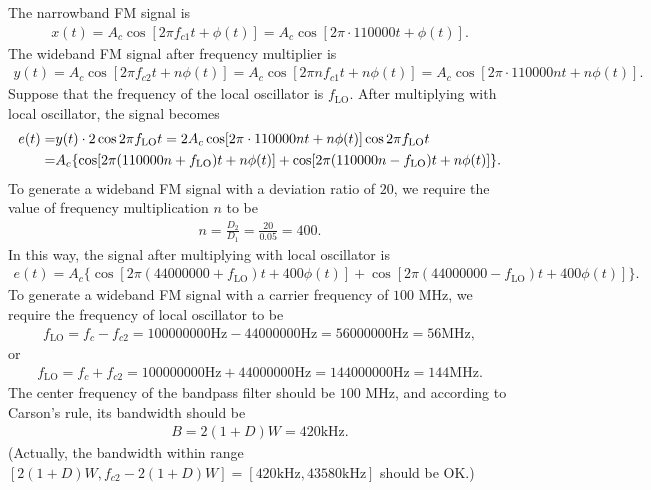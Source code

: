 \documentclass{assignment}
\begin{document}
\begin{sol}
    The narrowband FM signal is
    \begin{align}
        x(t)=A_c\cos[2\pi f_{c1}t+\phi(t)]=A_c\cos[2\pi\cdot 110000t+\phi(t)].
    \end{align}
    The wideband FM signal after frequency multiplier is
    \begin{align}
        y(t)=A_c\cos[2\pi f_{c2}t+n\phi(t)]=A_c\cos[2\pi nf_{c1}t+n\phi(t)]=A_c\cos[2\pi\cdot 110000nt+n\phi(t)].
    \end{align}
    Suppose that the frequency of the local oscillator is $f_{\text{LO}}$. After multiplying with local oscillator, the signal becomes
    \begin{align}
        \notag e(t)=&y(t)\cdot 2\cos 2\pi f_{\text{LO}}t=2A_c\cos[2\pi\cdot 110000nt+n\phi(t)]\cos 2\pi f_{\text{LO}}t\\
        =&A_c\{\cos[2\pi(110000n+f_{\text{LO}})t+n\phi(t)]+\cos[2\pi(110000n-f_{\text{LO}})t+n\phi(t)]\}.
    \end{align}
    To generate a wideband FM signal with a deviation ratio of $20$, we require the value of frequency multiplication $n$ to be
    \begin{align}
        n=\frac{D_2}{D_1}=\frac{20}{0.05}=400.
    \end{align}
    In this way, the signal after multiplying with local oscillator is
    \begin{align}
        e(t)=A_c\{\cos[2\pi(44000000+f_{\text{LO}})t+400\phi(t)]+\cos[2\pi(44000000-f_{\text{LO}})t+400\phi(t)]\}.
    \end{align}
    To generate a wideband FM signal with a carrier frequency of $100$ MHz, we require the frequency of local oscillator to be
    \begin{align}
        f_{\text{LO}}=f_c-f_{c2}=100000000\mathrm{Hz}-44000000\mathrm{Hz}=56000000\mathrm{Hz}=56\mathrm{MHz},
    \end{align}
    or
    \begin{align}
        f_{\text{LO}}=f_c+f_{c2}=100000000\mathrm{Hz}+44000000\mathrm{Hz}=144000000\mathrm{Hz}=144\mathrm{MHz}.
    \end{align}
    The center frequency of the bandpass filter should be $100$ MHz, and according to Carson's rule, its bandwidth should be
    \begin{align}
        B=2(1+D)W=420\mathrm{kHz}.
    \end{align}
    (Actually, the bandwidth within range $[2(1+D)W,f_{c2}-2(1+D)W]=[420\mathrm{kHz},43580\mathrm{kHz}]$ should be OK.)
\end{sol}
\end{document}
